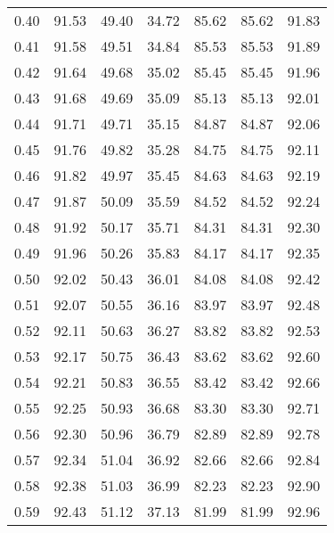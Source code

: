 \begin{tabular}{|c|c|c|c|c|c|c|}
      0.40 &     91.53 &     49.40 &      34.72 &   85.62 &      85.62 &         91.83 \\
      0.41 &     91.58 &     49.51 &      34.84 &   85.53 &      85.53 &         91.89 \\
      0.42 &     91.64 &     49.68 &      35.02 &   85.45 &      85.45 &         91.96 \\
      0.43 &     91.68 &     49.69 &      35.09 &   85.13 &      85.13 &         92.01 \\
      0.44 &     91.71 &     49.71 &      35.15 &   84.87 &      84.87 &         92.06 \\
      0.45 &     91.76 &     49.82 &      35.28 &   84.75 &      84.75 &         92.11 \\
      0.46 &     91.82 &     49.97 &      35.45 &   84.63 &      84.63 &         92.19 \\
      0.47 &     91.87 &     50.09 &      35.59 &   84.52 &      84.52 &         92.24 \\
      0.48 &     91.92 &     50.17 &      35.71 &   84.31 &      84.31 &         92.30 \\
      0.49 &     91.96 &     50.26 &      35.83 &   84.17 &      84.17 &         92.35 \\
      0.50 &     92.02 &     50.43 &      36.01 &   84.08 &      84.08 &         92.42 \\
      0.51 &     92.07 &     50.55 &      36.16 &   83.97 &      83.97 &         92.48 \\
      0.52 &     92.11 &     50.63 &      36.27 &   83.82 &      83.82 &         92.53 \\
      0.53 &     92.17 &     50.75 &      36.43 &   83.62 &      83.62 &         92.60 \\
      0.54 &     92.21 &     50.83 &      36.55 &   83.42 &      83.42 &         92.66 \\
      0.55 &     92.25 &     50.93 &      36.68 &   83.30 &      83.30 &         92.71 \\
      0.56 &     92.30 &     50.96 &      36.79 &   82.89 &      82.89 &         92.78 \\
      0.57 &     92.34 &     51.04 &      36.92 &   82.66 &      82.66 &         92.84 \\
      0.58 &     92.38 &     51.03 &      36.99 &   82.23 &      82.23 &         92.90 \\
      0.59 &     92.43 &     51.12 &      37.13 &   81.99 &      81.99 &         92.96 \\

\end{tabular}
